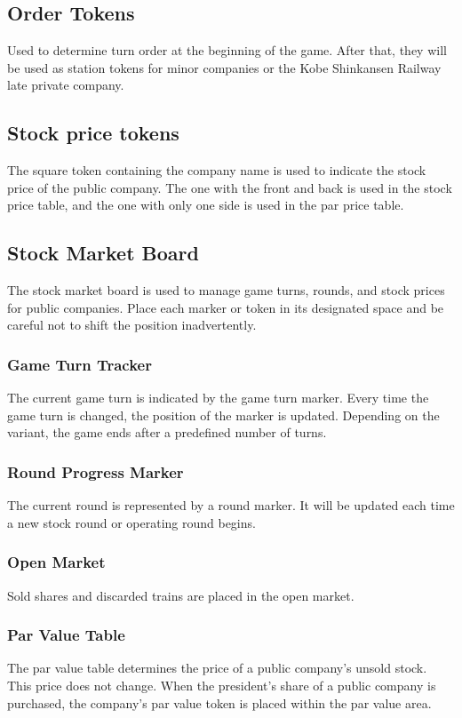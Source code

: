 \documentclass{article}
\begin{document}
\begin{CJK}{UTF8}{min}
\begin{multicols}{2}
\subsection{Order Tokens}
Used to determine turn order at the beginning of the game. After
that, they will be used as station tokens for minor companies or the
Kobe Shinkansen Railway late private company.



\subsection{Stock price tokens}
The square token containing the company name is used to indicate the
stock price of the public company. The one with the front and back is
used in the stock price table, and the one with only one side is used
in the par price table.


\subsection{Stock Market Board}
The stock market board is used to manage game turns, rounds, and stock
prices for public companies. Place each marker or token in its
designated space and be careful not to shift the position
inadvertently.


\subsubsection{Game Turn Tracker}
The current game turn is indicated by the game turn marker. Every time
the game turn is changed, the position of the marker is
updated. Depending on the variant, the game ends after a predefined
number of turns.


\subsubsection{Round Progress Marker}
The current round is represented by a round marker. It will be
updated each time a new stock round or operating round begins.


\subsubsection{Open Market}
Sold shares and discarded trains are placed in the open market.



\subsubsection{Par Value Table}
The par value table determines the price of a public company's
unsold stock. This price does not change. When the president's share
of a public company is purchased, the company's par value token is
placed within the par value area.




\end{multicols}
\end{CJK}
\end{document}
